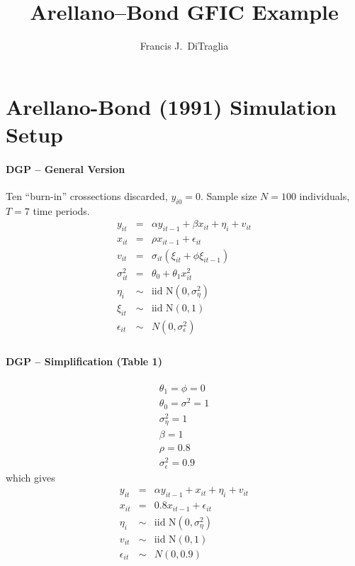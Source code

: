 \documentclass[12pt]{article}
\title{Arellano--Bond GFIC Example}
\author{Francis J.\ DiTraglia}
\begin{document}
\maketitle

\section{Arellano-Bond (1991) Simulation Setup}

\paragraph{DGP -- General Version}
Ten ``burn-in'' crossections discarded, $y_{i0}=0$. Sample size $N =100$ individuals, $T = 7$ time periods. 
    \begin{eqnarray*}
      y_{it} &=& \alpha y_{it-1} + \beta x_{it} + \eta_i + v_{it}\\
      x_{it} &=& \rho x_{it-1} + \epsilon_{it}\\
      v_{it} &=& \sigma_{it}(\xi_{it} + \phi \xi_{it-1})\\
      \sigma_{it}^2 &=& \theta_0 + \theta_1 x_{it}^2\\
      \eta_i &\sim& \mbox{iid N}(0,\sigma_\eta^2)\\
      \xi_{it} &\sim& \mbox{iid N}(0,1)\\
      \epsilon_{it} &\sim& N(0,\sigma_\epsilon^2)\\
    \end{eqnarray*}

\paragraph{DGP -- Simplification (Table 1)} 
  \begin{eqnarray*}
    \theta_1 = \phi = 0\\
    \theta_0 = \sigma^2 = 1\\
    \sigma^2_{\eta} = 1\\
    \beta = 1\\
    \rho = 0.8\\
    \sigma_\epsilon^2 = 0.9
  \end{eqnarray*}
which gives
    \begin{eqnarray*}
      y_{it} &=& \alpha y_{it-1} + x_{it} + \eta_i + v_{it}\\
      x_{it} &=& 0.8 x_{it-1} + \epsilon_{it}\\
      \eta_i &\sim& \mbox{iid N}(0,\sigma_\eta^2)\\
      v_{it} &\sim& \mbox{iid N}(0,1)\\
      \epsilon_{it} &\sim& N(0,0.9)\\
    \end{eqnarray*}
\end{document}
